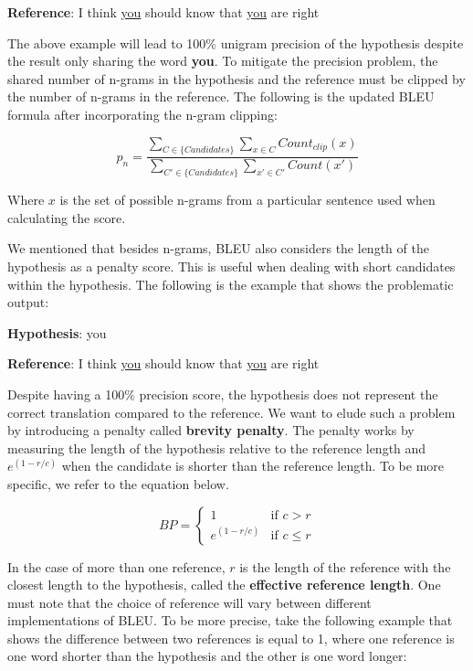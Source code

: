\textbf{Reference}: I think \underline{you} should know that \underline{you} are right

\bigskip

The above example will lead to 100\% unigram precision of the hypothesis despite the result only sharing the word \textbf{you}. To mitigate the precision problem, the shared number of n-grams in the hypothesis and the reference must be clipped by the number of n-grams in the reference. The following is the updated BLEU formula after incorporating the n-gram clipping:

\begin{equation}
    p_n=\frac{\sum_{C\in\{Candidates\}}\sum_{x\in C}Count_{clip}(x)}{\sum_{C'\in\{Candidates\}}\sum_{x'\in C'}Count(x')}
\end{equation}

Where $x$ is the set of possible n-grams from a particular sentence used when calculating the score.

We mentioned that besides n-grams, BLEU also considers the length of the hypothesis as a penalty score. This is useful when dealing with short candidates within the hypothesis. The following is the example that shows the problematic output:

\bigskip

\textbf{Hypothesis}: you

\textbf{Reference}: I think \underline{you} should know that \underline{you} are right

\bigskip

Despite having a 100\% precision score, the hypothesis does not represent the correct translation compared to the reference. We want to elude such a problem by introducing a penalty called \textbf{brevity penalty}. The penalty works by measuring the length of the hypothesis relative to the reference length and  $e^{(1-r/c)}$ when the candidate is shorter than the reference length. To be more specific, we refer to the equation below.

\begin{equation}
    BP=\begin{cases} 1 & \mbox{if } c>r \\ e^{(1-r/c)} & \mbox{if } c\le r \end{cases}
\end{equation}

In the case of more than one reference, $r$ is the length of the reference with the closest length to the hypothesis, called the \textbf{effective reference length}. One must note that the choice of reference will vary between different implementations of BLEU. To be more precise, take the following example that shows the difference between two references is equal to 1, where one reference is one word shorter than the hypothesis and the other is one word longer:

